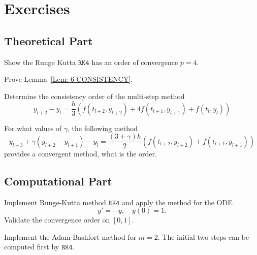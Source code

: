 \section{Exercises}
\subsection{Theoretical Part}
\begin{problem}
    Show the Runge Kutta $\texttt{RK4}$ has an order of convergence $p=4$.
\end{problem}
\begin{problem}
    Prove Lemma~\ref{Lem: 6-CONSISTENCY}.
\end{problem}
\begin{problem}
    Determine the consistency order of the multi-step method 
    \begin{equation}
        y_{l+2} - y_{l} = \frac{h}{3} \left( f(t_{l+2}, y_{l+2}) + 4 f(t_{l+1}, y_{l+1}) + f(t_l, y_l) \right)
    \end{equation}
\end{problem}
\begin{problem}
    For what values of $\gamma$, the following method
    \begin{equation}
        y_{l+3} + \gamma(y_{l+2} - y_{l+1}) - y_{l} = \frac{(3 + \gamma) h}{2} \left( f(t_{l+2}, y_{l+2}) + f(t_{l+1}, y_{l+1}) \right)
    \end{equation} 
    provides a convergent method, what is the order.
\end{problem}
\subsection{Computational Part}
\begin{problem}
    Implement Runge-Kutta method $\texttt{RK4}$ and apply the method for the ODE 
    \begin{equation}
        y' = - y,\quad y(0) = 1.
    \end{equation}
    Validate the convergence order on $[0, 1]$.
\end{problem}
\begin{problem}
    Implement the Adam-Bashfort method for $m=2$. The initial two steps can be computed first by $\texttt{RK4}$.
\end{problem}

